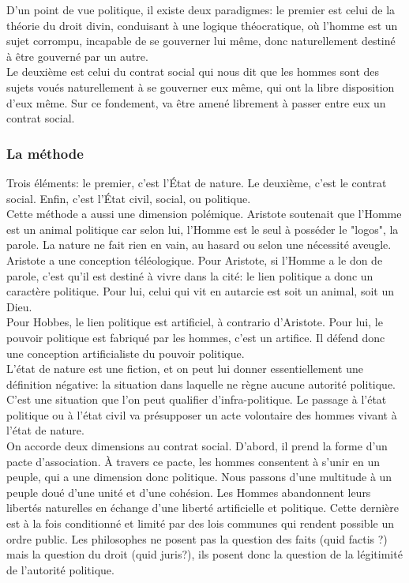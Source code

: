 \documentclass[10pt, a4paper, openany]{book}
\begin{document}
D'un point de vue politique, il existe deux paradigmes: le premier est celui de la théorie du droit divin, conduisant à une logique théocratique, où l'homme est un sujet corrompu, incapable de se gouverner lui même, donc naturellement destiné à être gouverné par un autre. \\
Le deuxième est celui du contrat social qui nous dit que les hommes sont des sujets voués naturellement à se gouverner eux même, qui ont la libre disposition d'eux même. Sur ce fondement, va être amené librement à passer entre eux un contrat social. 

\subsubsection{La méthode}

Trois éléments: le premier, c'est l'État de nature. Le deuxième, c'est le contrat social. Enfin, c'est l'État civil, social, ou politique. \\
Cette méthode a aussi une dimension polémique. Aristote soutenait que l'Homme est un animal politique car selon lui, l'Homme est le seul à posséder le "logos", la parole. La nature ne fait rien en vain, au hasard ou selon une nécessité aveugle. Aristote a une conception téléologique. Pour Aristote, si l'Homme a le don de parole, c'est qu'il est destiné à vivre dans la cité: le lien politique a donc un caractère politique. Pour lui, celui qui vit en autarcie est soit un animal, soit un Dieu. \\
Pour Hobbes, le lien politique est artificiel, à contrario d'Aristote. Pour lui, le pouvoir politique est fabriqué par les hommes, c'est un artifice. Il défend donc une conception artificialiste du pouvoir politique. \\
L'état de nature est une fiction, et on peut lui donner essentiellement une définition négative: la situation dans laquelle ne règne aucune autorité politique. C'est une situation que l'on peut qualifier d'infra-politique. Le passage à l'état politique ou à l'état civil va présupposer un acte volontaire des hommes vivant à l'état de nature. \\
On accorde deux dimensions au contrat social. D'abord, il prend la forme d'un pacte d'association. À travers ce pacte, les hommes consentent à s'unir en un peuple, qui a une dimension donc politique. Nous passons d'une multitude à un peuple doué d'une unité et d'une cohésion. Les Hommes abandonnent leurs libertés naturelles en échange d'une liberté artificielle et politique. Cette dernière est à la fois conditionné et limité par des lois communes qui rendent possible un ordre public. Les philosophes ne posent pas la question des faits (quid factis ?) mais la question du droit (quid juris?), ils posent donc la question de la légitimité de l'autorité politique. 
\end{document}
